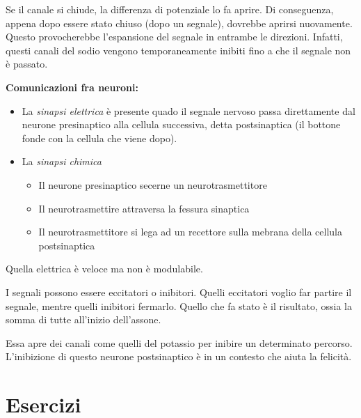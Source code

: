 \documentclass[a4paper]{article}
\begin{document}
Se il canale si chiude, la differenza di potenziale lo fa aprire.
Di conseguenza, appena dopo essere stato chiuso (dopo un segnale), dovrebbe aprirsi nuovamente.
Questo provocherebbe l'espansione del segnale in entrambe le direzioni.
Infatti, questi canali del sodio vengono temporaneamente inibiti fino a che il segnale non è passato.

\textbf{Comunicazioni fra neuroni:}

\begin{itemize}
    \item  La \textit{sinapsi elettrica} è presente quado il segnale nervoso passa direttamente dal
    neurone presinaptico alla cellula successiva, detta postsinaptica (il bottone fonde con la cellula che viene dopo).
    \item La \textit{sinapsi chimica}
    \begin{itemize}
        \item Il neurone presinaptico secerne un neurotrasmettitore
        \item Il neurotrasmettire attraversa la fessura sinaptica
        \item Il neurotrasmettitore si lega ad un recettore sulla mebrana della cellula postsinaptica
    \end{itemize}
\end{itemize}


Quella elettrica è veloce ma non è modulabile.

I segnali possono essere eccitatori o inibitori.
Quelli eccitatori voglio far partire il segnale, mentre quelli inibitori
fermarlo. Quello che fa stato è il risultato, ossia la somma di tutte
all'inizio dell'assone.

Essa apre dei canali come quelli del potassio per inibire un determinato percorso.
L'inibizione di questo neurone postsinaptico è in un contesto che aiuta la felicità.

\pagebreak

\section{Esercizi}
\end{document}
